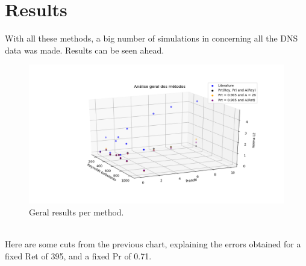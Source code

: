 \documentclass[10pt]{article} %
\begin{document}
\section{Results}
With all these methods, a big number of simulations in concerning all the DNS data was made.
Results can be seen ahead.\\
\begin{figure}[!h]
	\centering
	\includegraphics[angle=0, scale=0.42]{finais}
	\caption{Geral results per method.}
\end{figure}
\\
Here are some cuts from the previous chart, explaining the errors obtained for a fixed Ret of 395, and a fixed Pr of 0.71.
\end{document}
